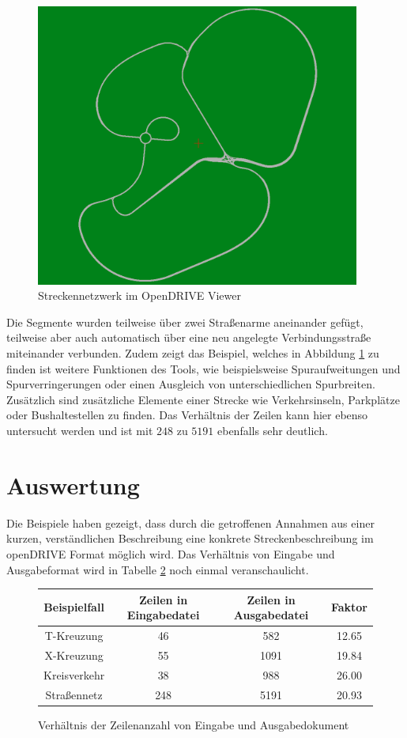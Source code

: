 \begin{figure}[H]
\flushleft
\includegraphics[width=0.95\textwidth]{fig/fig8.png}
\caption{Streckennetzwerk im OpenDRIVE Viewer}
\label{abb9}
\end{figure}

Die Segmente wurden teilweise über zwei Straßenarme aneinander gefügt, teilweise aber auch automatisch über eine neu angelegte Verbindungsstraße miteinander verbunden. Zudem zeigt das Beispiel, welches in Abbildung \ref{abb9} zu finden ist weitere Funktionen des Tools, wie beispielsweise Spuraufweitungen und Spurverringerungen oder einen Ausgleich von unterschiedlichen Spurbreiten. Zusätzlich sind zusätzliche Elemente einer Strecke wie Verkehrsinseln, Parkplätze oder Bushaltestellen zu finden. Das Verhältnis der Zeilen kann hier ebenso untersucht werden und ist mit \(248\) zu \(5191\) ebenfalls sehr deutlich.

\section{Auswertung}

Die Beispiele haben gezeigt, dass durch die getroffenen Annahmen aus einer kurzen, verständlichen Beschreibung eine konkrete Streckenbeschreibung im openDRIVE Format möglich wird. Das Verhältnis von Eingabe und Ausgabeformat wird in Tabelle \ref{tab1} noch einmal veranschaulicht.
\begin{figure}
    \centering
    \begin{tabular}{c|c|c|c}
        \toprule
        \textbf{Beispielfall} & Zeilen in Eingabedatei & Zeilen in Ausgabedatei & Faktor \\
        \midrule
        T-Kreuzung   & 46 & 582  & 12.65\\
        X-Kreuzung   & 55 & 1091 & 19.84\\
        Kreisverkehr & 38 & 988 & 26.00\\
        Straßennetz  & 248 & 5191 & 20.93 \\
        \bottomrule
    \end{tabular}            
    \caption{Verhältnis der Zeilenanzahl von Eingabe und Ausgabedokument}
    \label{tab1}
\end{figure}


